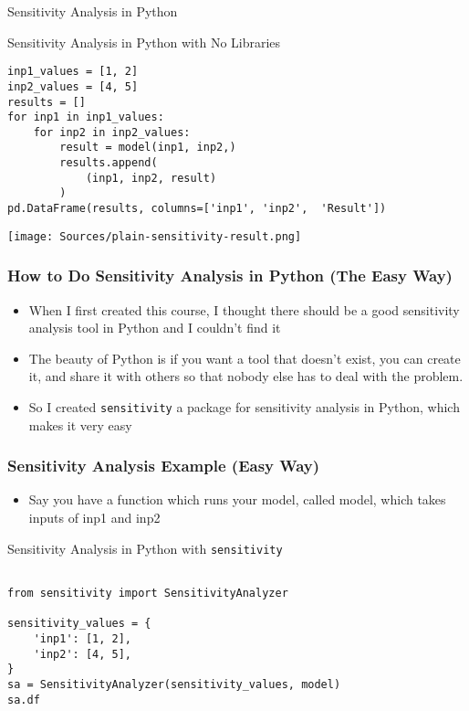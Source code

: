 \documentclass[handout, 11pt]{beamer}
\begin{document}
\begin{section}[SA Python]{Sensitivity Analysis in Python}
\begin{frame}[fragile]
\begin{block}{Sensitivity Analysis in Python with No Libraries}
\begin{verbatim}
inp1_values = [1, 2]
inp2_values = [4, 5]
results = []
for inp1 in inp1_values:
    for inp2 in inp2_values:
        result = model(inp1, inp2,)
        results.append(
            (inp1, inp2, result)
        )
pd.DataFrame(results, columns=['inp1', 'inp2',  'Result'])

\end{verbatim}
\texttt{[image: Sources/plain-sensitivity-result.png]}
\end{block}
\end{frame}
\begin{frame}
\frametitle{How to Do Sensitivity Analysis in Python (The Easy Way)}
\begin{itemize}
\item When I first created this course, I thought there should be a good sensitivity analysis tool in Python and I couldn't find it
\vfill
\item The beauty of Python is if you want a tool that doesn't exist, you can create it, and share it with others so that nobody else has to deal with the problem.
\vfill
\item So I created
\texttt{sensitivity}
a package for sensitivity analysis in Python, which makes it very easy
\end{itemize}
\end{frame}
\begin{frame}[fragile]
\frametitle{Sensitivity Analysis Example (Easy Way)}
\scriptsize
\begin{itemize}
\item Say you have a function which runs your model, called model, which takes inputs of inp1 and inp2
\end{itemize}
\begin{block}{Sensitivity Analysis in Python with \texttt{sensitivity}}
\begin{verbatim}

from sensitivity import SensitivityAnalyzer

sensitivity_values = {
    'inp1': [1, 2],
    'inp2': [4, 5],
}
sa = SensitivityAnalyzer(sensitivity_values, model)
sa.df


\end{verbatim}
\end{block}
\end{frame}
\end{section}
\end{document}
